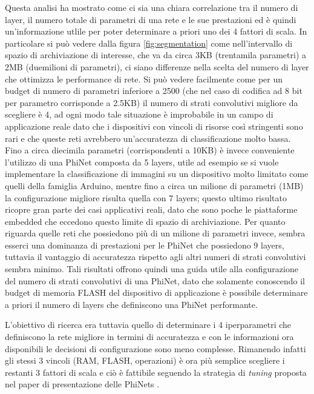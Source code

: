 Questa analisi ha mostrato come ci sia una chiara correlazione tra il numero di layer, il numero totale di parametri di una rete e le sue prestazioni ed è quindi un'informazione utlile per poter determinare a priori uno dei 4 fattori di scala. 
In particolare si può vedere dalla figura \ref{fig:segmentation} come nell'intervallo di spazio di archiviazione di interesse, che va da circa 3KB (trentamila parametri) a 2MB (duemilioni di parametri), ci siano differenze nella scelta del numero di layer che ottimizza le performance di rete. Si può vedere facilmente come per un budget di numero di parametri inferiore a 2500 (che nel caso di codifica ad 8 bit per parametro corrisponde a 2.5KB) il numero di strati convolutivi migliore da scegliere è 4, ad ogni modo tale situazione è improbabile in un campo di applicazione reale dato che i dispositivi con vincoli di risorse così stringenti sono rari e che queste reti avrebbero un'accuratezza di classificazione molto bassa. Fino a circa diecimila parametri (corrispondenti a 10KB) è invece conveniente l'utilizzo di una PhiNet composta da 5 layers, utile ad esempio se si vuole implementare la classificazione di immagini su un dispositivo molto limitato come quelli della famiglia Arduino, mentre fino a circa un milione di parametri (1MB) la configurazione migliore risulta quella con 7 layers; questo ultimo risultato ricopre gran parte dei casi applicativi reali, dato che sono poche le piattaforme embedded che eccedono questo limite di spazio di archiviazione. Per quanto riguarda quelle reti che possiedono più di un milione di parametri invece, sembra esserci una dominanza di prestazioni per le PhiNet che possiedono 9 layers, tuttavia il vantaggio di accuratezza rispetto agli altri numeri di strati convolutivi sembra minimo.
Tali risultati offrono quindi una guida utile alla configurazione del numero di strati convolutivi di una PhiNet, dato che solamente conoscendo il budget di memoria FLASH del dispositivo di applicazione è possibile determinare a priori il numero di layers che definiscono una PhiNet performante. 

L'obiettivo di ricerca era tuttavia quello di determinare i 4 iperparametri che definiscono la rete migliore in termini di accuratezza e con le informazioni ora disponibili le decisioni di configurazione sono meno complesse.
Rimanendo infatti gli stessi 3 vincoli (RAM, FLASH, operazioni) è ora più semplice scegliere i restanti 3 fattori di scala e ciò è fattibile seguendo la strategia di \textit{tuning} proposta nel paper di presentazione delle PhiNets \cite{10.1145/3510832}.

\afterpage{\null\newpage}

